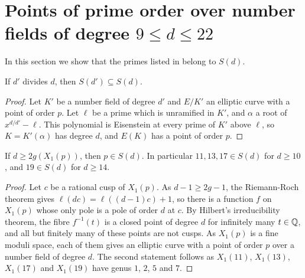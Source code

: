 \section{Points of prime order over number fields of degree \texorpdfstring{$9\leq d\leq 22$}{9 to 22}}\label{sec:lower}

In this section we show that the primes listed in  belong to $S(d)$.

\begin{lemma}\label{lem:basechange}
If $d'$ divides $d$, then $S(d')\subseteq S(d)$.
\end{lemma}

\begin{proof}
Let $K'$ be a number field of degree $d'$ and $E/K'$ an elliptic curve with a point of order $p$. Let $\ell$ be a prime which is unramified in $K'$, and $\alpha$ a root of $x^{d/d'}-\ell$. This polynomial is Eisenstein at every prime of $K'$ above $\ell$, so $K=K'(\alpha)$ has degree $d$, and $E(K)$ has a point of order $p$.
\end{proof}

\begin{lemma}\label{lem:RR}
If $d\geq 2g(X_1(p))$, then $p\in S(d)$. In particular $11,13,17\in S(d)$ for $d\geq 10$, and $19\in S(d)$ for $d\geq 14$.
\end{lemma}

\begin{proof}
Let $c$ be a rational cusp of $X_1(p)$. As $d-1\geq 2g-1$, the Riemann-Roch theorem gives $\ell(dc)=\ell((d-1)c)+1$, so there is a function $f$ on $X_1(p)$ whose only pole is a pole of order $d$ at $c$. By Hilbert's irreducibility theorem, the fibre $f^{-1}(t)$ is a closed point of degree $d$ for infinitely many $t\in\mathbb{Q}$, and all but finitely many of these points are not cusps. As $X_1(p)$ is a fine moduli space, each of them gives an elliptic curve with a point of order $p$ over a number field of degree $d$. The second statement follows as $X_1(11)$, $X_1(13)$, $X_1(17)$ and $X_1(19)$ have genus $1$, $2$, $5$ and $7$.
\end{proof}

